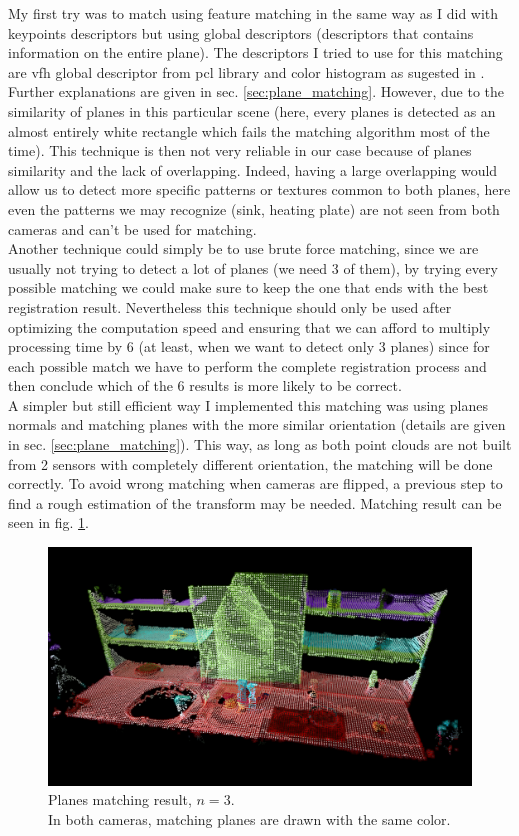My first try was to match using feature matching in the same way as I did with keypoints descriptors but using global descriptors (descriptors that contains information on the entire plane). The descriptors I tried to use for this matching are \acrshort{vfh} global descriptor from \acrshort{pcl} \gls{library} and color histogram as sugested in \cite{mdou2013}. Further explanations are given in sec. \ref{sec:plane_matching}. However, due to the similarity of planes in this particular scene (here, every planes is detected as an almost entirely white rectangle which fails the matching algorithm most of the time). This technique is then not very reliable in our case because of planes similarity and the lack of overlapping. Indeed, having a large overlapping would allow us to detect more specific patterns or textures common to both planes, here even the patterns we may recognize (sink, heating plate) are not seen from both cameras and can't be used for matching. \\
Another technique could simply be to use brute force matching, since we are usually not trying to detect a lot of planes (we need 3 of them), by trying every possible matching we could make sure to keep the one that ends with the best registration result. Nevertheless this technique should only be used after optimizing the computation speed and ensuring that we can afford to multiply processing time by 6 (at least, when we want to detect only 3 planes) since for each possible match we have to perform the complete registration process and then conclude which of the 6 results is more likely to be correct. \\
A simpler but still efficient way I implemented this matching was using planes normals and matching planes with the more similar orientation (details are given in sec. \ref{sec:plane_matching}). This way, as long as both point clouds are not built from 2 sensors with completely different orientation, the matching will be done correctly. To avoid wrong matching when cameras are flipped, a previous step to find a rough estimation of the transform may be needed.
Matching result can be seen in fig. \ref{fig:planes_scene}.

\begin{figure}[h!]
    \centering
    \includegraphics[width=\textwidth]{images/planes_scene.png}
    \caption{Planes matching result, $n=3$.\\In both cameras, matching planes are drawn with the same color.}
    \label{fig:planes_scene}
\end{figure}

